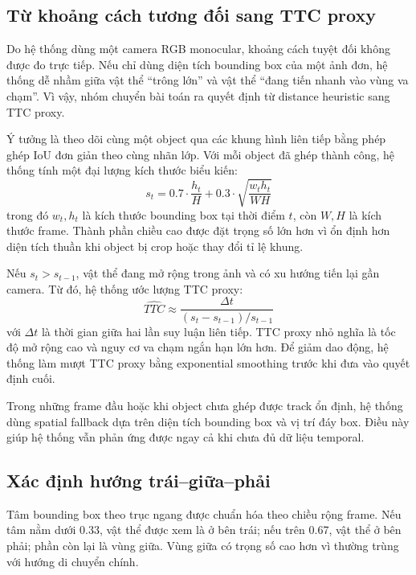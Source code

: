 \documentclass[twoside,final]{hcmut-report}
\begin{document}
\subsection{Từ khoảng cách tương đối sang TTC proxy}
Do hệ thống dùng một camera RGB monocular, khoảng cách tuyệt đối không được đo trực tiếp. Nếu chỉ dùng diện tích bounding box của một ảnh đơn, hệ thống dễ nhầm giữa vật thể ``trông lớn'' và vật thể ``đang tiến nhanh vào vùng va chạm''. Vì vậy, nhóm chuyển bài toán ra quyết định từ distance heuristic sang TTC proxy.

Ý tưởng là theo dõi cùng một object qua các khung hình liên tiếp bằng phép ghép IoU đơn giản theo cùng nhãn lớp. Với mỗi object đã ghép thành công, hệ thống tính một đại lượng kích thước biểu kiến:
\[
s_t = 0.7 \cdot \frac{h_t}{H} + 0.3 \cdot \sqrt{\frac{w_t h_t}{WH}}
\]
trong đó $w_t, h_t$ là kích thước bounding box tại thời điểm $t$, còn $W, H$ là kích thước frame. Thành phần chiều cao được đặt trọng số lớn hơn vì ổn định hơn diện tích thuần khi object bị crop hoặc thay đổi tỉ lệ khung.

Nếu $s_t > s_{t-1}$, vật thể đang mở rộng trong ảnh và có xu hướng tiến lại gần camera. Từ đó, hệ thống ước lượng TTC proxy:
\[
\widehat{TTC} \approx \frac{\Delta t}{(s_t - s_{t-1}) / s_{t-1}}
\]
với $\Delta t$ là thời gian giữa hai lần suy luận liên tiếp. TTC proxy nhỏ nghĩa là tốc độ mở rộng cao và nguy cơ va chạm ngắn hạn lớn hơn. Để giảm dao động, hệ thống làm mượt TTC proxy bằng exponential smoothing trước khi đưa vào quyết định cuối.

Trong những frame đầu hoặc khi object chưa ghép được track ổn định, hệ thống dùng spatial fallback dựa trên diện tích bounding box và vị trí đáy box. Điều này giúp hệ thống vẫn phản ứng được ngay cả khi chưa đủ dữ liệu temporal.

\subsection{Xác định hướng trái--giữa--phải}
Tâm bounding box theo trục ngang được chuẩn hóa theo chiều rộng frame. Nếu tâm nằm dưới 0.33, vật thể được xem là ở bên trái; nếu trên 0.67, vật thể ở bên phải; phần còn lại là vùng giữa. Vùng giữa có trọng số cao hơn vì thường trùng với hướng di chuyển chính.
\end{document}
